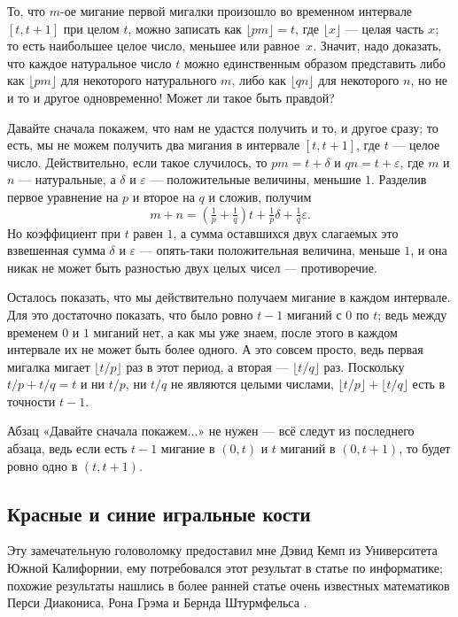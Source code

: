 То, что $m$-ое мигание первой мигалки произошло во временном интервале $[t, t + 1]$ при целом $t$,
можно записать как $\lfloor pm\rfloor = t$, где $\lfloor x\rfloor$ — целая часть $x$; то есть наибольшее целое число, меньшее или равное~$x$.
Значит, надо доказать, что каждое натуральное число $t$ можно единственным образом представить либо как $\lfloor pm\rfloor$ для некоторого натурального $m$, либо как $\lfloor qn\rfloor$ для некоторого $n$, но не и то и другое одновременно!
Может ли такое быть правдой?

Давайте сначала покажем, что нам не удастся получить и то, и другое сразу;
то есть, мы не можем получить два мигания в интервале $[t, t+1]$, где $t$ --- целое число.
Действительно, если такое случилось, то $pm = t+\delta$ и $qn = t + \varepsilon$, где $m$ и $n$ --- натуральные, а $\delta$ и $\varepsilon$ --- положительные величины, меньшие $1$. 
Разделив первое уравнение на $p$ и второе на $q$ и сложив, получим
\[m+n=(\tfrac1p+\tfrac1q)t+\tfrac1p\delta+\tfrac1q\varepsilon.\]
Но коэффициент при $t$ равен $1$, а сумма оставшихся двух слагаемых это взвешенная сумма $\delta$ и $\varepsilon$ --- опять-таки положительная величина, меньше $1$, и она никак не может быть разностью двух целых чисел --- противоречие.

Осталось показать, что мы действительно получаем мигание в каждом интервале.
Для это достаточно показать, что было ровно $t - 1$ миганий с $0$ по $t$;
ведь между временем $0$ и $1$ миганий нет, а как мы уже знаем, после этого в каждом интервале их не может быть более одного.
А это совсем просто, ведь первая мигалка мигает $\lfloor t/p\rfloor$ раз в этот период, а вторая --- $\lfloor t/q\rfloor$ раз.
Поскольку $t/p + t/q = t$ и ни $t/p$, ни $t/q$ не являются целыми числами, $\lfloor t/p\rfloor + \lfloor t/q\rfloor$ есть в точности $t - 1$.

\begin{addedbytheeditors}
Абзац «Давайте сначала покажем...» не нужен --- всё следут из последнего абзаца, ведь если есть $t-1$ мигание в $(0,t)$ и $t$ миганий в $(0,t+1)$, то будет ровно одно в $(t,t+1)$.
\end{addedbytheeditors}


\subsection*{Красные и синие игральные кости}

Эту замечательную головоломку предоставил мне Дэвид Кемп из Университета Южной Калифорнии, ему потребовался этот результат в статье по информатике;
похожие результаты нашлись в более ранней статье очень известных математиков Перси Диакониса, Рона Грэма и Бернда Штурмфельса \cite{14}.

